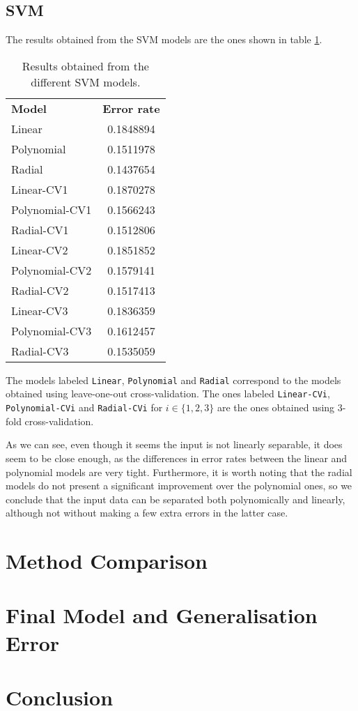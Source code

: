 \documentclass[english]{scrartcl}
\newcommand\ms[1]{\texttt{#1}}
\begin{document}
    \subsection{SVM}
    The results obtained from the SVM models are the ones shown in table \ref{table:svm-results}.
    
    \begin{table}[h]
    \centering
    \begin{tabular}{l c}
    \textbf{Model} & \textbf{Error rate} \\
    Linear & 0.1848894 \\
	Polynomial & 0.1511978 \\
	Radial & 0.1437654 \\
	Linear-CV1 & 0.1870278 \\
	Polynomial-CV1 & 0.1566243 \\
	Radial-CV1 & 0.1512806 \\
	Linear-CV2 & 0.1851852 \\
	Polynomial-CV2 & 0.1579141 \\
	Radial-CV2 & 0.1517413 \\
	Linear-CV3 & 0.1836359 \\
	Polynomial-CV3 & 0.1612457 \\
	Radial-CV3 & 0.1535059 \\
    \end{tabular}
    \caption{Results obtained from the different SVM models.}
    \label{table:svm-results}
    \end{table}
    
    The models labeled \ms{Linear}, \ms{Polynomial} and \ms{Radial} correspond to the models obtained using leave-one-out cross-validation. The ones labeled \ms{Linear-CVi}, \ms{Polynomial-CVi} and \ms{Radial-CVi} for $i \in \{1,2,3\}$ are the ones obtained using 3-fold cross-validation.
    
    As we can see, even though it seems the input is not linearly separable, it does seem to be close enough, as the differences in error rates between the linear and polynomial models are very tight. Furthermore, it is worth noting that the radial models do not present a significant improvement over the polynomial ones, so we conclude that the input data can be separated both polynomically and linearly, although not without making a few extra errors in the latter case.

\section{Method Comparison}

\section{Final Model and Generalisation Error}

\section{Conclusion}
\end{document}
